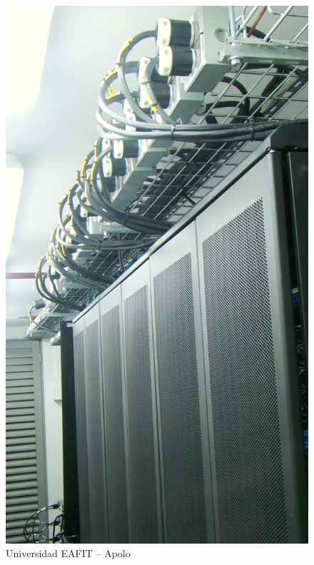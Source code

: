 \begin{frame}
 \begin{figure}[ht]
        \centering
        \includegraphics[scale=0.1, angle=90]{imgs/apolo5}
        \caption{Universidad EAFIT -- Apolo}
 \end{figure}
\end{frame}

